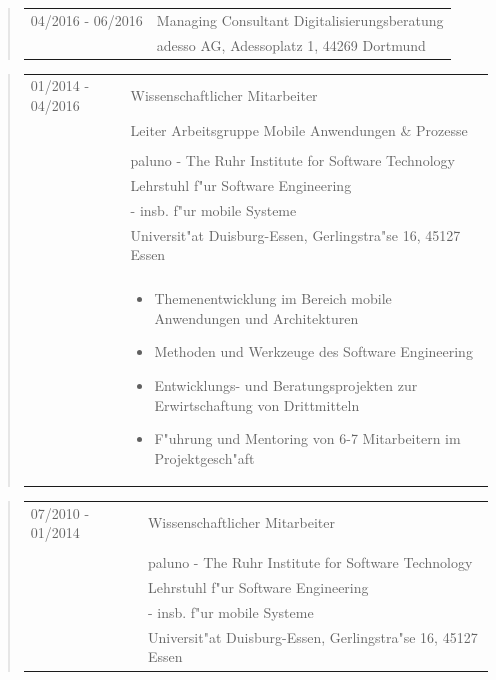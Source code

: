 	\begin{quote}
		\begin{tabular}{p{4cm}l}
			04/2016 - 06/2016&Managing Consultant Digitalisierungsberatung\\
			&adesso AG, Adessoplatz 1, 44269 Dortmund\\
		\end{tabular}
	\end{quote}
	\begin{quote}
		\begin{tabular}{p{4cm}l}
			01/2014 - 04/2016&Wissenschaftlicher Mitarbeiter\\
			&Leiter Arbeitsgruppe Mobile Anwendungen \& Prozesse\\\\
			&paluno - The Ruhr Institute for Software Technology\\
			&Lehrstuhl f"ur Software Engineering\\
			&\qquad - insb. f"ur mobile Systeme\\
			&Universit"at Duisburg-Essen, Gerlingstra"se 16, 45127 Essen\\
			\\
			&\begin{minipage}{10cm}
                \begin{itemize}
                    \item Themenentwicklung im Bereich mobile Anwendungen und Architekturen
                    \item Methoden und Werkzeuge des Software Engineering
                    \item Entwicklungs- und Beratungsprojekten zur Erwirtschaftung von Drittmitteln
                    \item F"uhrung und Mentoring von 6-7 Mitarbeitern im Projektgesch"aft
                \end{itemize}
			\end{minipage}
		\end{tabular}
	\end{quote}
	\begin{quote}
		\begin{tabular}{p{4cm}l}
			07/2010 - 01/2014&Wissenschaftlicher Mitarbeiter\\\\
			&paluno - The Ruhr Institute for Software Technology\\
			&Lehrstuhl f"ur Software Engineering\\
			&\qquad - insb. f"ur mobile Systeme\\
			&Universit"at Duisburg-Essen, Gerlingstra"se 16, 45127 Essen
		\end{tabular}
	\end{quote}
